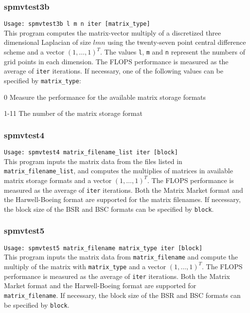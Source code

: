 \documentclass[a4paper]{article}
\newcommand{\namelistlabel}[1]{\mbox{#1}\hfill}
\newenvironment{namelist}[1]{%
\begin{list}{}
  {\let\makelabel\namelistlabel
  \settowidth{\labelwidth}{#1}
  \setlength{\leftmargin}{1.1\labelwidth}}
  }{%
\end{list}}
\begin{document}
\subsubsection{spmvtest3b}

\verb+Usage: spmvtest3b l m n iter [matrix_type]+\\

This program computes the matrix-vector multiply of a 
discretized three dimensional Laplacian of size $lmn$ using 
the twenty-seven point central difference scheme and a vector $(1,\dots,1)^T$. 
The values {\tt l}, {\tt m} and {\tt n} represent the numbers of grid
points in each dimension. 
The FLOPS performance is measured as the average of {\tt iter}
iterations.
If necessary, one of the following values can be specified by {\tt matrix\_type}:
\begin{namelist}{XXXXXXXXXXXXXXXXXXXX}
\item[0] Measure the performance for the available matrix storage formats
\item[1-11] The number of the matrix storage format
\end{namelist}

\subsubsection{spmvtest4}

\verb+Usage: spmvtest4 matrix_filename_list iter [block]+\\

This program inputs the matrix data from the files listed in {\tt matrix\_filename\_list}, 
and computes the multiplies of matrices in available matrix 
storage formats and a vector $(1,\dots,1)^T$. 
The FLOPS performance is measured as the average of {\tt iter}
iterations.
Both the Matrix Market format and the Harwell-Boeing format are
supported for the matrix filenames. 
If necessary, the block size of the BSR and BSC formats can be specified
by {\tt block}.

\subsubsection{spmvtest5}

\verb+Usage: spmvtest5 matrix_filename matrix_type iter [block]+\\

This program inputs the matrix data from {\tt matrix\_filename} 
and compute the multiply of the matrix 
with \verb|matrix_type| and a vector $(1,\dots,1)^T$. 
The FLOPS performance is measured as the average of {\tt iter} iterations.
Both the Matrix Market format and the Harwell-Boeing format are
supported for {\tt matrix\_filename}. 
If necessary, the block size of the BSR and BSC formats can be specified by {\tt block}.
\end{document}
